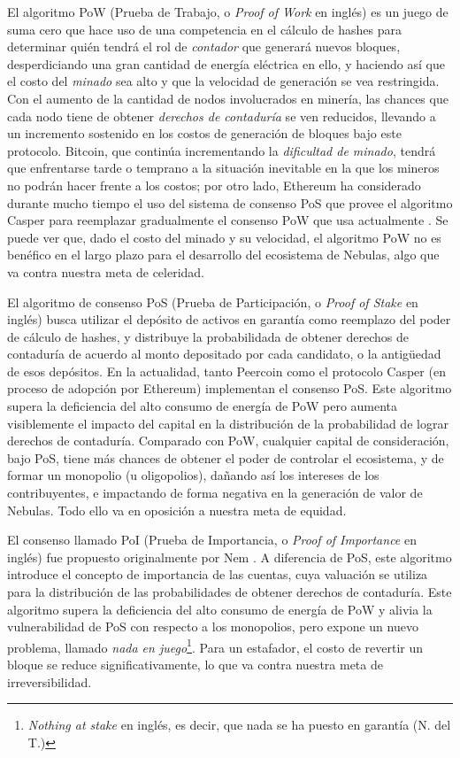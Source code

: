 El algoritmo PoW (Prueba de Trabajo, o \textit{Proof of Work} en inglés) es un juego de suma cero que hace uso de una competencia en el cálculo de hashes para determinar quién tendrá el rol de \textit{contador} que generará nuevos bloques, desperdiciando una gran cantidad de energía eléctrica en ello, y haciendo así que el costo del \textit{minado} sea alto y que la velocidad de generación se vea restringida. Con el aumento de la cantidad de nodos involucrados en minería, las chances que cada nodo tiene de obtener \textit{derechos de contaduría} se ven reducidos, llevando a un incremento sostenido en los costos de generación de bloques bajo este protocolo. Bitcoin, que continúa incrementando la \textit{dificultad de minado}, tendrá que enfrentarse tarde o temprano a la situación inevitable en la que los mineros no podrán hacer frente a los costos; por otro lado, Ethereum ha considerado durante mucho tiempo el uso del sistema de consenso PoS que provee el algoritmo Casper \cite{casper} para reemplazar gradualmente el consenso PoW que usa actualmente \cite{buterin2013ethereum}. Se puede ver que, dado el costo del minado y su velocidad, el algoritmo PoW no es benéfico en el largo plazo para el desarrollo del ecosistema de Nebulas, algo que va contra nuestra meta de celeridad.

El algoritmo de consenso PoS (Prueba de Participación, o \textit{Proof of Stake} en inglés) busca utilizar el depósito de activos en garantía como reemplazo del poder de cálculo de hashes, y distribuye la probabilidada de obtener derechos de contaduría de acuerdo al monto depositado por cada candidato, o la antigüedad de esos depósitos. En la actualidad, tanto Peercoin \cite{king2012peercoin} como el protocolo Casper (en proceso de adopción por Ethereum) implementan el consenso PoS. Este algoritmo supera la deficiencia del alto consumo de energía de PoW pero aumenta visiblemente el impacto del capital en la distribución de la probabilidad de lograr derechos de contaduría. Comparado con PoW, cualquier capital de consideración, bajo PoS, tiene más chances de obtener el poder de controlar el ecosistema, y de formar un monopolio (u oligopolios), dañando así los intereses de los contribuyentes, e impactando de forma negativa en la generación de valor de Nebulas. Todo ello va en oposición a nuestra meta de equidad.

El consenso llamado PoI (Prueba de Importancia, o \textit{Proof of Importance} en inglés) fue propuesto originalmente por Nem \cite{nem}. A diferencia de PoS, este algoritmo introduce el concepto de importancia de las cuentas, cuya valuación se utiliza para la distribución de las probabilidades de obtener derechos de contaduría. Este algoritmo supera la deficiencia del alto consumo de energía de PoW y alivia la vulnerabilidad de PoS con respecto a los monopolios, pero expone un nuevo problema, llamado \textit{nada en juego}\footnote{\textit{Nothing at stake} en inglés, es decir, que nada se ha puesto en garantía (N. del T.)}. Para un estafador, el costo de revertir un bloque se reduce significativamente, lo que va contra nuestra meta de irreversibilidad.

